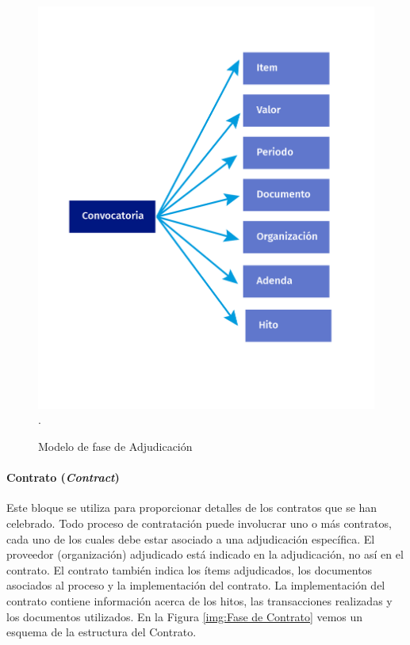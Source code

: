 \begin{figure}[htbp!]
    \centering
    \includegraphics[width=150mm]{figuras/Diagramas_Adjudicacion.png}.
    \caption{Modelo de fase de Adjudicación}
    \label{img:Fase de Adjudiacion}
\end{figure}


\paragraph{Contrato (\textit{Contract})}\hfill \break
Este bloque se utiliza para proporcionar detalles de los contratos que se han celebrado. Todo proceso de contratación puede involucrar uno o más contratos, cada uno de los cuales debe estar asociado a una adjudicación específica. El proveedor (organización) adjudicado está indicado en la adjudicación, no así en el contrato. El contrato también indica los ítems adjudicados, los documentos asociados al proceso y la implementación del contrato. La implementación del contrato contiene información acerca de los hitos, las transacciones realizadas y los documentos utilizados. En la Figura \ref{img:Fase de Contrato} vemos un esquema de la estructura del Contrato.

